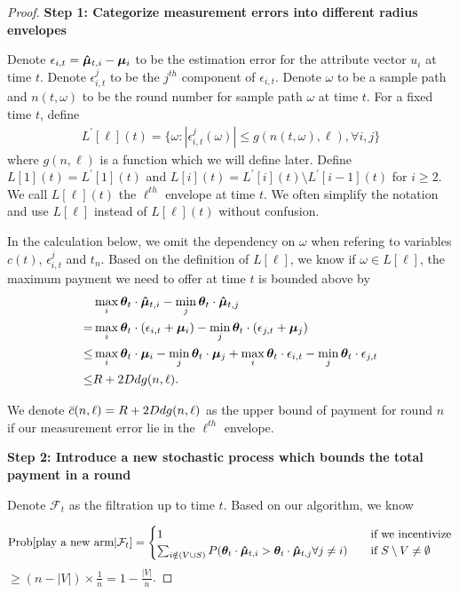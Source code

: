 \begin{proof}

\noindent\textbf{Step 1: Categorize measurement errors into different radius envelopes}


Denote $\epsilon_{i,t}=\bm{\hat{\mu}}_{t,i}-\bm{\mu}_{i}$ to be the estimation error for the attribute vector $u_i$ at time $t$. Denote $\epsilon_{i,t}^{j}$ to be the $j^{th}$ component of $\epsilon_{i,t}$. Denote $\omega$ to be a sample path and $n(t,\omega)$ to be the round number for sample path $\omega$ at time $t$. For a fixed time $t$, define
\begin{align}
L^{'}[\ell](t) = \{\omega:|\epsilon_{i,t}^{j}(\omega)|\leq g(n(t,\omega),\ell), \forall i,j\}\nonumber
\end{align}
where $g(n,\ell)$ is a function which we will define later. Define $L[1](t) = L^{'}[1](t)$ and $L[i](t) = L^{'}[i](t)\setminus L^{'}[i-1](t)$ for $i\geq 2$. We call $L[\ell](t)$ the $\ell^{th}$ envelope at time $t$. We often simplify the notation and use $L[\ell]$ instead of $L[\ell](t)$ without confusion.

In the calculation below, we omit the dependency on $\omega$ when refering to variables $c(t)$, $\epsilon_{i,t}^{j}$ and $t_n$. Based on the definition of $L[\ell]$, we know if $\omega\in L[\ell]$, the maximum payment we need to offer at time $t$ is bounded above by 
\begin{align}
&\max_{i}\bm{\theta}_{t}\cdot \bm{\hat{\mu}}_{t,i} - \min_{j}\bm{\theta}_{t}\cdot \bm{\hat{\mu}}_{t,j} \nonumber \\
= &\max_{i}\bm{\theta}_{t}\cdot (\epsilon_{i,t}+\bm{\mu}_{i}) - \min_{j}\bm{\theta}_{t}\cdot (\epsilon_{j,t}+\bm{\mu}_{j}) \nonumber \\
\leq &\max_{i}\bm{\theta}_{t}\cdot \bm{\mu}_{i} - \min_{j}\bm{\theta}_{t}\cdot \bm{\mu}_{j} +\max_{i}\bm{\theta}_{t}\cdot \epsilon_{i,t} - \min_{j}\bm{\theta}_{t}\cdot \epsilon_{j,t}\nonumber \\
\leq & R + 2D dg(n,\ell). \nonumber
\end{align}

We denote $\bar{c}(n,\ell)=R + 2D dg(n,\ell)$ as the upper bound of payment for round $n$ if our measurement error lie in the $\ell^{th}$ envelope.


\noindent\textbf{Step 2: Introduce a new stochastic process which bounds the total payment in a round}

Denote $\mathcal{F}_t$ as the filtration up to time $t$. Based on our algorithm, we know

\[ \Prob{\text{play a new arm}|\mathcal{F}_t} =
\begin{cases}
1       & \quad \text{if we incentivize}\\
\sum_{i\notin (V\cup S)} P(\AgentV{t} \cdot \ArmEV{t}{i}>\AgentV{t}\cdot \ArmEV{t}{j} \forall j\neq i)  & \quad \text{if }  S\setminus V\neq \emptyset 
\end{cases} \label{dom_stoc}
\] 
\hspace{1cm}$\geq (n-|V|)\times \frac{1}{n}=1-\frac{|V|}{n}$.


\end{proof}
